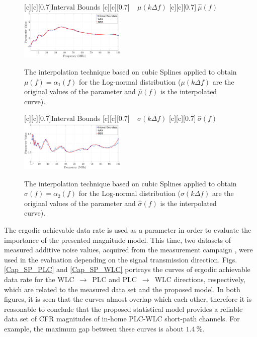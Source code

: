 \documentclass[journal]{IEEEtran}
\begin{document}
\begin{figure}[h]
	\centering
	[c][0.7]{Interval Bounds}
	[c][0.7]{$~~~~~\mu(k \Delta f)$}
	[c][0.7]{$~\hat{\mu}(f)$}
	\includegraphics[width=0.45\textwidth]{images/Alfa_fitsW.eps}
	\caption{The interpolation technique based on cubic Splines applied to obtain $\mu(f)=\alpha_1(f)$ for the Log-normal distribution (${\mu}(k \Delta f)$ are the original values of the parameter and $\hat{\mu}(f)$ is the interpolated curve).}
	\label{Fit_alfasW}
\end{figure}

\begin{figure}[h]
	\centering
	[c][0.7]{Interval Bounds}
	[c][0.7]{${~~~~~\sigma}(k \Delta f)$}
	[c][0.7]{$~\hat{\sigma}(f)$}
	\includegraphics[width=0.45\textwidth]{images/Beta_fitsW.eps}
	\caption{The interpolation technique based on cubic Splines applied to obtain $\sigma(f)=\alpha_2(f)$ for the Log-normal distribution (${\sigma}(k \Delta f)$ are the original values of the parameter and $\hat{\sigma}(f)$ is the interpolated curve).}
	\label{Fit_betasW}
\end{figure}

The ergodic achievable data rate is used as a parameter in order to evaluate the importance of the presented magnitude model. This time, two datasets of measured additive noise values, acquired from the measurement campaign \cite{thiago:hyb2}, were used in the evaluation depending on the signal transmission direction. Figs. \ref{Cap_SP_PLC} and \ref{Cap_SP_WLC} portrays the curves of ergodic achievable data rate for the \ac{WLC}~$\rightarrow$~\ac{PLC} and \ac{PLC}~$\rightarrow$~\ac{WLC} directions, respectively, which are related to the measured data set and the proposed model. In both figures, it is seen that the curves almost overlap which each other, therefore it is reasonable to conclude that the proposed statistical model provides a reliable data set of \ac{CFR} magnitudes of in-home \ac{PLC}-\ac{WLC} short-path channels. For example, the maximum gap between these curves is about $1.4~\%$.
\end{document}
